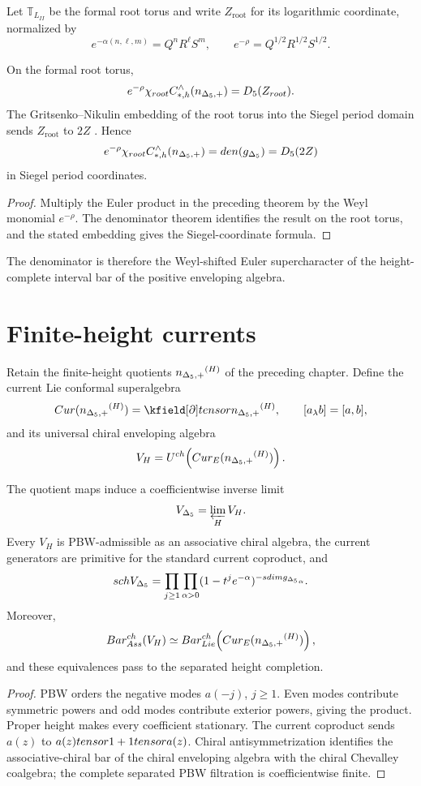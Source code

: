 Let $\mathbb T_{L_{II}}$ be the formal root torus and write $Z_{\mathrm{root}}$ for its logarithmic coordinate, normalized by
\[
 e^{-\alpha(n,\ell,m)}=Q^nR^\ell S^m,
 \qquad
 e^{-\rho}=Q^{1/2}R^{1/2}S^{1/2}.
\]

\begin{corollary}
On the formal root torus,
\[
 e^{-\rho}\chi_{\mathrm{root}}
 C_{*,h}^\wedge(\nIg)
 =\Dmon(Z_{\mathrm{root}}).
\]
The Gritsenko--Nikulin embedding of the root torus into the Siegel period domain sends $Z_{\mathrm{root}}$ to $2Z$ \cite{GN97,GN98b}. Hence
\[
 e^{-\rho}\chi_{\mathrm{root}}
 C_{*,h}^\wedge(\nIg)
 =\den(\gIg)=\Dmon(2Z)
\]
in Siegel period coordinates.
\end{corollary}
\begin{proof}
Multiply the Euler product in the preceding theorem by the Weyl monomial $e^{-\rho}$.  The denominator theorem identifies the result on the root torus, and the stated embedding gives the Siegel-coordinate formula.
\end{proof}

The denominator is therefore the Weyl-shifted Euler supercharacter of the height-complete interval bar of the positive enveloping algebra.

\chapter{Finite-height currents}
Retain the finite-height quotients $\nIg^{(H)}$ of the preceding chapter.  Define the current Lie conformal superalgebra
\[
 \Cur(\nIg^{(H)})=\kfield[\partial]\tensor\nIg^{(H)},
 \qquad [a_\lambda b]=[a,b],
\]
and its universal chiral enveloping algebra
\[
 V_H=U^{\ch}\!\left(\Cur_E(\nIg^{(H)})\right).
\]

\begin{theorem}
The quotient maps induce a coefficientwise inverse limit
\[
 \widehat V_{\Delta_5}=\varprojlim_HV_H.
\]
Every $V_H$ is PBW-admissible as an associative chiral algebra, the current generators are primitive for the standard current coproduct, and
\[
 \sch\widehat V_{\Delta_5}
 =\prod_{j\ge1}\prod_{\alpha>0}
 (1-t^je^{-\alpha})^{-\sdim\gIg_\alpha}.
\]
Moreover,
\[
 \BarAssCh(V_H)
 \simeq
 \BarLieCh\!\left(\Cur_E(\nIg^{(H)})\right),
\]
and these equivalences pass to the separated height completion.
\end{theorem}
\begin{proof}
PBW orders the negative modes $a(-j)$, $j\ge1$.  Even modes contribute symmetric powers and odd modes contribute exterior powers, giving the product.  Proper height makes every coefficient stationary.  The current coproduct sends $a(z)$ to $a(z)\tensor1+1\tensor a(z)$.  Chiral antisymmetrization identifies the associative-chiral bar of the chiral enveloping algebra with the chiral Chevalley coalgebra; the complete separated PBW filtration is coefficientwise finite.
\end{proof}

